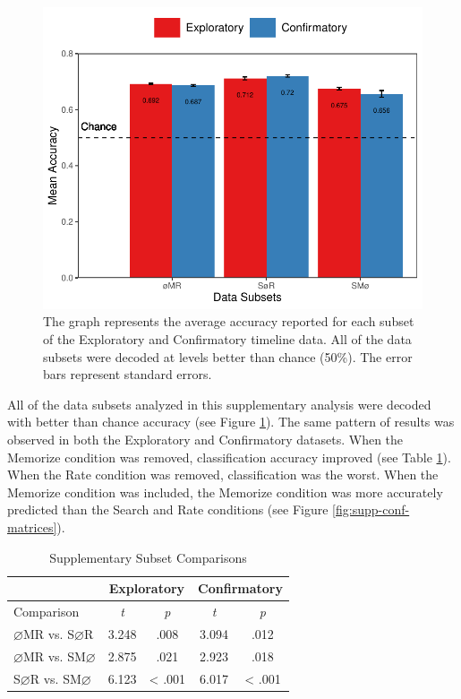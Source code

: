 \documentclass[
  english,
  man,floatsintext]{apa6}
\begin{document}
\begin{appendix}
\begin{figure}
\centering
\includegraphics{supplementary_analysis/supp_subset_chance.pdf}
\caption{\label{fig:supp-chance}The graph represents the average accuracy
reported for each subset of the Exploratory and Confirmatory timeline
data. All of the data subsets were decoded at levels better than chance
(50\%). The error bars represent standard errors.}
\end{figure}

All of the data subsets analyzed in this supplementary analysis were
decoded with better than chance accuracy (see Figure
\ref{fig:supp-chance}). The same pattern of results was observed in both
the Exploratory and Confirmatory datasets. When the Memorize condition
was removed, classification accuracy improved (see Table
\ref{tab:supp-comparisons}). When the Rate condition was removed,
classification was the worst. When the Memorize condition was included,
the Memorize condition was more accurately predicted than the Search and
Rate conditions (see Figure \ref{fig:supp-conf-matrices}).

\begin{table}[!h]
\centering
\caption{Supplementary Subset Comparisons}
\label{tab:supp-comparisons}
\begin{tabular}{l c c c c}
& \multicolumn{2}{c}{Exploratory} & \multicolumn{2}{c}{Confirmatory} \\
\hline
Comparison & \textit{t} & \multicolumn{1}{c|}{\textit{p}} & \textit{t} & \textit{p} \\
\hline
$\varnothing$MR vs. S$\varnothing$R & 3.248 & \multicolumn{1}{c|}{.008} & 3.094 & .012 \\
$\varnothing$MR vs. SM$\varnothing$ & 2.875 & \multicolumn{1}{c|}{.021} & 2.923 & .018 \\
S$\varnothing$R vs. SM$\varnothing$ & 6.123 & \multicolumn{1}{c|}{< .001} & 6.017 & < .001 \\
\hline
\end{tabular}
\end{table}


\end{appendix}
\end{document}

